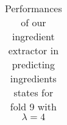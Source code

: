 \documentclass{article}
\begin{document}
\begin{table}
\begin{center}
\begin{tabular}{| l | l | l | l | l | l | l | l | l |}
    \end{tabular}
    \label{tab:tab10}
\end{center}
\caption{Performances of our ingredient extractor in predicting ingredients states for fold 9 with $\lambda = 4$}
\end{table}
\end{document}

